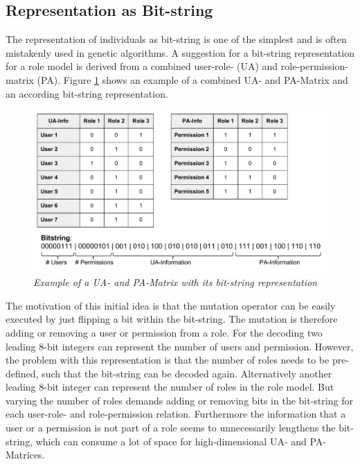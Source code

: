         \subsection{Representation as Bit-string}
        The representation of individuals as bit-string is one of the simplest and is often mistakenly used in genetic algorithms\cite{Eiben}. A suggestion for a bit-string representation for a role model is derived from a combined user-role- (UA) and role-permission-matrix (PA). Figure \ref{fig:representation1} shows an example of a combined UA- and PA-Matrix and an according bit-string representation.
        \begin{figure}[H]
            \centering
            \includegraphics[scale=0.4]{./Figures/BitstringRepresentation}
            \caption{\textit{Example of a UA- and PA-Matrix with its bit-string representation}}
            \label{fig:representation1}
        \end{figure}
        The motivation of this initial idea is that the mutation operator can be easily executed by just flipping a bit within the bit-string. The mutation is therefore adding or removing a user or permission from a role. For the decoding two leading 8-bit integers can represent the number of users and permission. However, the problem with this representation is that the number of roles needs to be pre-defined, such that the bit-string can be decoded again. Alternatively another leading 8-bit integer can represent the number of roles in the role model. But varying the number of roles demands adding or removing bits in the bit-string for each user-role- and role-permission relation. Furthermore the information that a user or a permission is not part of a role seems to unnecessarily lengthens the bit-string, which can consume a lot of space for high-dimensional UA- and PA-Matrices.
